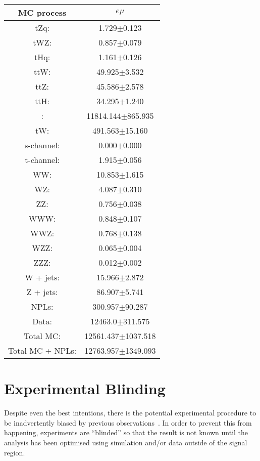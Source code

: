 \begin{table}[htbp]
\label{tab:ttbarCR}
  \centering
 \begin{tabular}{cc}
   \hline
   \textbf{MC process} & \textbf{$e\mu$}  \\
   \hline
	tZq\@: & 1.729$\pm$0.123  \\
	tWZ\@: & 0.857$\pm$0.079  \\
	tHq\@: & 1.161$\pm$0.126  \\
	ttW\@: & 49.925$\pm$3.532   \\
	ttZ\@: & 45.586$\pm$2.578   \\
	ttH\@: & 34.295$\pm$1.240  \\
	\ttbar: & 11814.144$\pm$865.935   \\
	tW\@: & 491.563$\pm$15.160   \\
	s-channel\@: &  0.000$\pm$0.000 \\
	t-channel\@: & 1.915$\pm$0.056 \\
	WW\@: & 10.853$\pm$1.615  \\
	WZ\@: & 4.087$\pm$0.310 \\
	ZZ\@: & 0.756$\pm$0.038 \\
	WWW\@: & 0.848$\pm$0.107     \\
	WWZ\@: & 0.768$\pm$0.138     \\
	WZZ\@: & 0.065$\pm$0.004     \\
	ZZZ\@: & 0.012$\pm$0.002     \\
	W + jets\@: & 15.966$\pm$2.872     \\
	Z + jets\@: & 86.907$\pm$5.741     \\
	NPLs\@: & 300.957$\pm$90.287     \\
	\hline
	Data\@: & 12463.0$\pm$311.575     \\
	\hline
	Total MC\@: & 12561.437$\pm$1037.518     \\
	Total MC + NPLs\@: & 12763.957$\pm$1349.093     \\
   \hline
 \end{tabular}
\end{table}

\section{Experimental Blinding}\label{sec:blinding}
Despite even the best intentions, there is the potential experimental procedure to be inadvertently biased by previous observations~\cite{Roodman:2003rw}.
In order to prevent this from happening, experiments are ``blinded'' so that the result is not known until the analysis has been optimised using simulation and/or data outside of the signal region.

